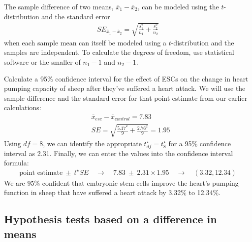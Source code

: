 {\begin{termBox}{
The sample difference of two means, $\bar{x}_1 - \bar{x}_2$, can be modeled using the $t$-distribution and the standard error
\begin{eqnarray}
\textstyle
SE_{\bar{x}_{1} - \bar{x}_{2}} = \sqrt{\frac{s_1^2}{n_1} + \frac{s_2^2}{n_2}}
\label{seOfDifferenceInMeans}
\end{eqnarray}
when each sample mean can itself be modeled using a $t$-distribution and the samples are independent. To calculate the degrees of freedom, use statistical software or the smaller of $n_1 - 1$ and $n_2 - 1$.}
\end{termBox}\textC{\vspace{-10mm}}

\begin{example}{Calculate a 95\% confidence interval for the effect of ESCs on the change in heart pumping capacity of sheep after they've suffered a heart attack.}
We will use the sample difference and the standard error for that point estimate from our earlier calculations:\textC{\vspace{-3mm}}
\begin{align*}
& \bar{x}_{esc} - \bar{x}_{control} = 7.83 \\
& SE = \sqrt{\frac{5.17^2}{9} + \frac{2.76^2}{9}} = 1.95
\end{align*}
Using $df = 8$, we can identify the appropriate $t^{\star}_{df} = t^{\star}_{8}$ for a 95\% confidence interval as 2.31. Finally, we can enter the values into the confidence interval formula:\textC{\vspace{-1mm}}
\begin{align*}
\text{point estimate} \ \pm\ t^{\star}SE \quad\rightarrow\quad
7.83 \ \pm\ 2.31\times 1.95 \quad\rightarrow\quad (3.32, 12.34)
\end{align*}
We are 95\% confident that embryonic stem cells improve the heart's pumping function in sheep that have suffered a heart attack by 3.32\% to 12.34\%.
\end{example}



\subsection{Hypothesis tests based on a difference in means}


}
